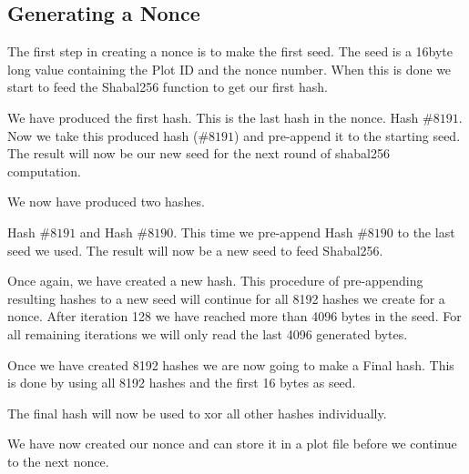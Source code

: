 \subsection{Generating a Nonce}
\begin{flushleft}
    The first step in creating a nonce is to make the first seed. The seed is a 16byte long value containing the Plot ID and the nonce number. When this is done we start to feed the Shabal256 function to get our first hash.
\end{flushleft}
\begin{flushleft}
    We have produced the first hash. This is the last hash in the nonce. Hash $\#8191$. Now we take this produced hash ($\#8191$) and pre-append it to the starting seed. The result will now be our new seed for the next round of shabal256 computation.
\end{flushleft}
\begin{flushleft}
    We now have produced two hashes.
\end{flushleft}
\begin{flushleft}
Hash $\#8191$ and Hash $\#8190$. This time we pre-append Hash $\#8190$ to the last seed we used. The result will now be a new seed to feed Shabal256.
\end{flushleft}
\begin{flushleft}
    Once again, we have created a new hash. This procedure of pre-appending resulting hashes to a new seed will continue for all 8192 hashes we create for a nonce. After iteration 128 we have reached more than 4096 bytes in the seed. For all remaining iterations we will only read the last 4096 generated bytes.
\end{flushleft}
\begin{flushleft}
    Once we have created 8192 hashes we are now going to make a Final hash. This is done by using all 8192 hashes and the first 16 bytes as seed.
\end{flushleft}

\begin{flushleft}
    The final hash will now be used to xor all other hashes individually.
\end{flushleft}
\begin{flushleft}
    We have now created our nonce and can store it in a plot file before we continue to the next nonce.
\end{flushleft}
